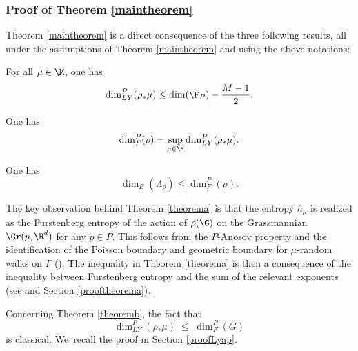\subsubsection{Proof of Theorem \ref{maintheorem}}

Theorem \ref{maintheorem} is a direct consequence of the three following results, all under the assumptions of Theorem \ref{maintheorem} and using the above notations:

\begin{theorem}\label{theorema}
For all \(\mu \in \M\), one has
\[
\dim_{LY}^P(\rho_*\mu) \le \dim(\F_P) - \frac{M - 1}{2}.
\]
\end{theorem}

\begin{theorem}\label{theoremb}
One has \begin{equation} \label{Lyapunov} \dim_F^P(\rho) = \sup_{\mu \in \M}\dim_{LY}^P(\rho_*\mu).\end{equation}
\end{theorem}

\begin{theorem}\label{theoremc}
One has
\[
\dim_B(\Lambda_\rho) \le \dim_F^P(\rho).
\]
\end{theorem}

The key observation behind Theorem \ref{theorema} is that the entropy \(h_\mu\) is realized as the Furstenberg entropy of the action of \(\rho (\G)\) on the Grassmannian \(\Gr(p,\R^d)\) for any \(p \in P\). This follows from the \(P\)-Anosov property and the identification of the Poisson boundary and geometric boundary for \(\mu\)-random walks on \(\Gamma\) (\cite{Kai00}). The inequality in Theorem \ref{theorema} is then a consequence of the inequality between Furstenberg entropy and the sum of the relevant exponents (see \cite{LL23} and Section \ref{prooftheorema}).

Concerning Theorem \ref{theoremb}, the fact that
\begin{equation}\label{LyapleqFalc} \dim_{LY}^P(\rho_*\mu) \; \leq \; \dim_F^P (G) \end{equation} is classical. We~recall the proof in Section \ref{proofLyap}.

